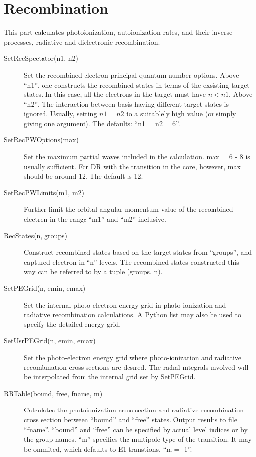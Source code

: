 \documentclass[12pt]{article}
\begin{document}
\section{Recombination}
This part calculates photoionization, autoionization rates, and their inverse
processes, radiative and dielectronic recombination.
\begin{description}
\item[SetRecSpectator(n1, n2)] 
Set the recombined electron principal quantum
number options. Above ``n1'', one constructs the recombined states in terms of
the exsisting target states. In this case, all the electrons in the target
must have $n < n1$. Above ``n2'', The interaction between basis having
different target states is ignored. Usually, setting $n1 = n2$ to a suitablely
high value (or simply giving one argument). The defaults: ``n1 = n2 = 6''.

\item[SetRecPWOptions(max)] 
Set the maximum partial waves included in the
calculation. max = 6 - 8 is usually sufficient. For DR with the transition in
the core, however, max should be around 12. The default is 12.

\item[SetRecPWLimits(m1, m2)] 
Further limit the orbital angular momentum value of the recombined electron
in the range ``m1'' and ``m2'' inclusive.

\item[RecStates(n, groups)] 
Construct recombined states based on the  target
states from ``groups'', and captured electron in ``n'' levels. The recombined
states constructed this way can be referred to by a tuple (groups, n). 

\item[SetPEGrid(n, emin, emax)] 
Set the internal photo-electron energy grid in photo-ionization and radiative
recombination calculations. A Python list may also be used to specify the
detailed energy grid. 

\item[SetUsrPEGrid(n, emin, emax)]
Set the photo-electron energy grid where photo-ionization and radiative
recombination cross sections are desired. The radial integrals involved will
be interpolated from the internal grid set by SetPEGrid.

\item[RRTable(bound, free, fname, m)] Calculates the photoionization cross
section and radiative recombination cross section between ``bound'' and
``free'' states. Output results to file ``fname''. ``bound'' and ``free'' can
be specified by actual level indices or by the group names. ``m'' specifies
the multipole type of the transition. It may be ommited, which defaults to E1
transtions, ``m = -1''.


\end{description}
\end{document}
